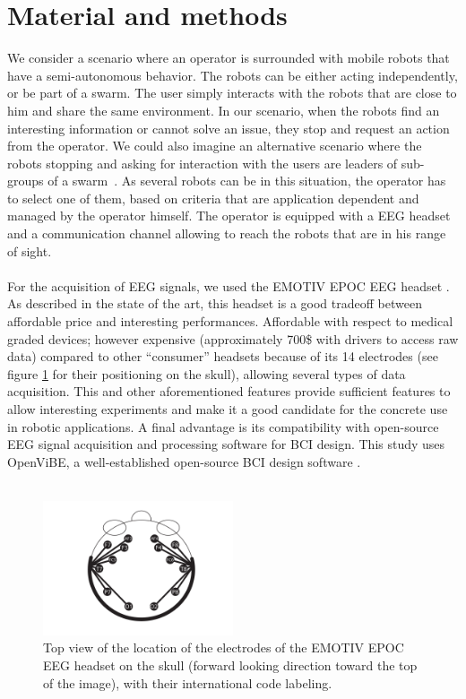 \documentclass[smallextended]{svjour3}
\begin{document}
\section{Material and methods}
\label{sec:methods}
We consider a scenario where an operator is surrounded with mobile robots that have a semi-autonomous behavior. 
The robots can be either acting independently, or be part of a swarm. The user simply interacts with the robots that are close to him and share the same environment.
In our scenario, when the robots find an interesting information or cannot solve an issue, they stop and request an action from the operator. We could also imagine an alternative scenario where the robots stopping and asking for interaction with the users are leaders of sub-groups of a swarm~\cite{Goodrich2012}. As several robots can be in this situation, the operator has to select one of them, based on criteria that are application dependent and managed by the operator himself. The operator is equipped with a EEG headset and a communication channel allowing to reach the robots that are in his range of sight. \\
\\
For the acquisition of EEG signals, we used the EMOTIV EPOC EEG headset \cite{stytsenko2011evaluation}. As described in the state of the art, this headset is a good tradeoff between affordable price and interesting performances. Affordable with respect to medical graded devices; however expensive (approximately 700\$ with drivers to access raw data) compared to other ``consumer'' headsets because of its 14 electrodes (see figure \ref{fig:electrodes} for their positioning on the skull), allowing several types of data acquisition. This and other aforementioned features provide sufficient features to allow interesting experiments and make it a good candidate for the concrete use in robotic applications. A final advantage is its compatibility with open-source EEG signal acquisition and processing software for BCI design. This study uses OpenViBE, a well-established open-source BCI design software \cite{ov_publication}.\\
\\
\begin{figure}
\center
\includegraphics[width=0.5\textwidth]{figures/emotiv-electrodes.pdf}
\caption{Top view of the location of the electrodes of the EMOTIV EPOC EEG headset on the skull (forward looking direction toward the top of the image), with their international code labeling.} \label{fig:electrodes}
\end{figure}
\end{document}
